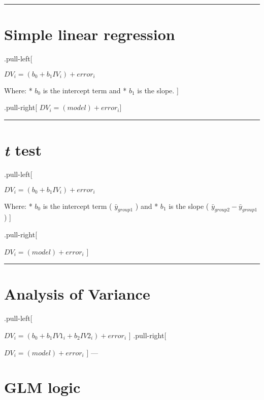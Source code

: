\documentclass[]{article}
\begin{document}
\begin{center}\rule{0.5\linewidth}{\linethickness}\end{center}

\hypertarget{simple-linear-regression}{%
\section{Simple linear regression}\label{simple-linear-regression}}

.pull-left{[}

\(DV_i=(b_0+b_1IV_i)+error_i\)

Where: * \(b_0\) is the intercept term and * \(b_1\) is the slope. {]}

.pull-right{[} \(DV_i=(model)+error_i\){]}

\begin{center}\rule{0.5\linewidth}{\linethickness}\end{center}

\hypertarget{t-test}{%
\section{\texorpdfstring{\emph{t} test}{t test}}\label{t-test}}

.pull-left{[}

\(DV_i=(b_0+b_1IV_i)+error_i\)

Where: * \(b_0\) is the intercept term ( \(\bar{y}_{group1}\) ) and *
\(b_1\) is the slope ( \(\bar{y}_{group2}-\bar{y}_{group1}\) ) {]}

.pull-right{[}

\(DV_i=(model)+error_i\) {]}

\begin{center}\rule{0.5\linewidth}{\linethickness}\end{center}

\hypertarget{analysis-of-variance}{%
\section{Analysis of Variance}\label{analysis-of-variance}}

.pull-left{[}

\(DV_i=(b_0+b_1IV1_i+b_2IV2_i)+error_i\) {]} .pull-right{[}

\(DV_i=(model)+error_i\) {]} ---

\hypertarget{glm-logic}{%
\section{GLM logic}\label{glm-logic}}
\end{document}
